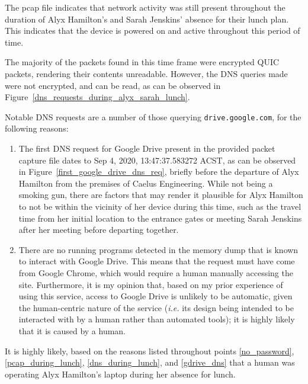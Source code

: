 \begin{myenum}
    \item \label{pcap_during_lunch} The pcap file indicates that network activity was still present throughout the duration of Alyx Hamilton's and Sarah Jenskins' absence for their lunch plan. This indicates that the device is powered on and active throughout this period of time.
    \item \label{dns_during_lunch} The majority of the packets found in this time frame were encrypted QUIC packets, rendering their contents unreadable. However, the DNS queries made were not encrypted, and can be read, as can be observed in Figure~\ref{dns_requests_during_alyx_sarah_lunch}.
    \item \label{gdrive_dns} Notable DNS requests are a number of those querying \texttt{drive.google.com}, for the following reasons:
        \begin{enumerate}
            \item The first DNS request for Google Drive present in the provided packet capture file dates to Sep 4, 2020, 13:47:37.583272 ACST, as can be observed in Figure~\ref{first_google_drive_dns_req}, briefly before the departure of Alyx Hamilton from the premises of Caelus Engineering. While not being a smoking gun, there are factors that may render it plausible for Alyx Hamilton to not be within the vicinity of her device during this time, such as the travel time from her initial location to the entrance gates or meeting Sarah Jenskins after her meeting before departing together.
            \item There are no running programs detected in the memory dump that is known to interact with Google Drive. This means that the request must have come from Google Chrome, which would require a human manually accessing the site. Furthermore, it is my opinion that, based on my prior experience of using this service, access to Google Drive is unlikely to be automatic, given the human-centric nature of the service (\emph{i.e.} its design being intended to be interacted with by a human rather than automated tools); it is highly likely that it is caused by a human. 
        \end{enumerate}
    \item \label{alyx_laptop_misuse} It is highly likely, based on the reasons listed throughout points \ref{no_password}, \ref{pcap_during_lunch}, \ref{dns_during_lunch}, and \ref{gdrive_dns} that a human was operating Alyx Hamilton's laptop during her absence for lunch.
\end{myenum}

